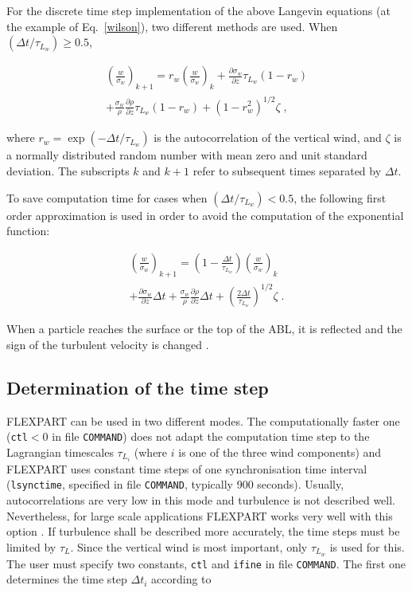 \documentclass{egu}            %
\begin{document}
For the discrete time step implementation of the above Langevin equations (at
the example of Eq.~\ref{wilson}), two different methods are used.  When $\left
(\Delta t/\tau_{L_w} \right) \ge 0.5$,

\begin{multline}
\left (\frac{w}{\sigma_w} \right)_{k+1}=
r_w \left (\frac{w}{\sigma_w} \right)_k
+ \frac{\partial \sigma_w}{\partial z} \tau_{L_w} \left (1-r_w \right )\\
+ \frac{\sigma_w}{\rho} \frac{\partial \rho}{\partial z} \tau_{L_w} \left (1-r_w \right )
+ \left (1-r_w^2 \right )^{1/2} \zeta \;,
\end{multline}

where $r_w=\exp(-\Delta t/ \tau_{L_w})$ is the autocorrelation of the vertical
wind, and $\zeta$ is a normally distributed random number with mean zero and
unit standard deviation.  The subscripts $k$ and $k+1$ refer to subsequent
times separated by $\Delta t$.

To save computation time for cases when $\left (\Delta t/\tau_{L_w} \right) <
0.5$, the following first order approximation is used in order to avoid the
computation of the exponential function:

\begin{multline}
\left (\frac{w}{\sigma_w} \right)_{k+1}=
\left (1-\frac{\Delta t}{\tau_{L_w}} \right )\left (\frac{w}{\sigma_w} \right)_k\\
+ \frac{\partial \sigma_w}{\partial z} \Delta t
+ \frac{\sigma_w}{\rho} \frac{\partial \rho}{\partial z} \Delta t
+ \left( \frac{2 \Delta t}{\tau_{L_w}} \right)^{1/2} \zeta \;.
\end{multline}

When a particle reaches the surface or the top of the ABL, it is reflected and
the sign of the turbulent velocity is changed \citep{wilson1993}.

\subsection{\label{timestep}Determination of the time step}

FLEXPART can be used in two different modes.  The computationally faster one
(\verb|ctl|$<$0 in file \verb|COMMAND|) does not adapt the computation time
step to the Lagrangian timescales $\tau_{L_i}$ (where $i$ is one of the three
wind components) and FLEXPART uses constant time steps of one synchronisation
time interval (\verb|lsynctime|, specified in file \verb|COMMAND|, typically
900 seconds).  Usually, autocorrelations are very low in this mode and
turbulence is not described well.  Nevertheless, for large scale applications
FLEXPART works very well with this option \citep{stohletal1998}.  If turbulence
shall be described more accurately, the time steps must be limited by $\tau_L$.
Since the vertical wind is most important, only $\tau_{L_w}$ is used for this.
The user must specify two constants, \verb|ctl| and \verb|ifine| in file
\verb|COMMAND|.  The first one determines the time step $\Delta t_i$ according
to
\end{document}
